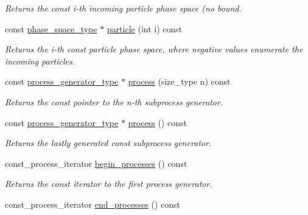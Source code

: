\begin{DoxyCompactItemize}
\begin{DoxyCompactList}\small\item\em Returns the const i-\/th incoming particle phase space (no bound. \end{DoxyCompactList}\item 
const \hyperlink{a00406}{phase\+\_\+space\+\_\+type} $\ast$ \hyperlink{a00212_aad5633c6865f0dfed332a7ca31f36621}{particle} (int i) const 
\begin{DoxyCompactList}\small\item\em Returns the i-\/th const particle phase space, where negative values enumerate the incoming particles. \end{DoxyCompactList}\item 
\hypertarget{a00212_a32760ad5ec0d357e0086617c77e99566}{}const \hyperlink{a00436}{process\+\_\+generator\+\_\+type} $\ast$ \hyperlink{a00212_a32760ad5ec0d357e0086617c77e99566}{process} (size\+\_\+type n) const \label{a00212_a32760ad5ec0d357e0086617c77e99566}

\begin{DoxyCompactList}\small\item\em Returns the const pointer to the n-\/th subprocess generator. \end{DoxyCompactList}\item 
\hypertarget{a00212_af4976d6c9b846daf993c28a01c3ad32c}{}const \hyperlink{a00436}{process\+\_\+generator\+\_\+type} $\ast$ \hyperlink{a00212_af4976d6c9b846daf993c28a01c3ad32c}{process} () const \label{a00212_af4976d6c9b846daf993c28a01c3ad32c}

\begin{DoxyCompactList}\small\item\em Returns the lastly generated const subprocess generator. \end{DoxyCompactList}\item 
\hypertarget{a00212_a971bcc180427c97b86c065a52a5a3f6b}{}const\+\_\+process\+\_\+iterator \hyperlink{a00212_a971bcc180427c97b86c065a52a5a3f6b}{begin\+\_\+processes} () const \label{a00212_a971bcc180427c97b86c065a52a5a3f6b}

\begin{DoxyCompactList}\small\item\em Returns the const iterator to the first process generator. \end{DoxyCompactList}\item 
\hypertarget{a00212_a43676ce551f831ea4df4259cfcff05c4}{}const\+\_\+process\+\_\+iterator \hyperlink{a00212_a43676ce551f831ea4df4259cfcff05c4}{end\+\_\+processes} () const \label{a00212_a43676ce551f831ea4df4259cfcff05c4}


\end{DoxyCompactItemize}
